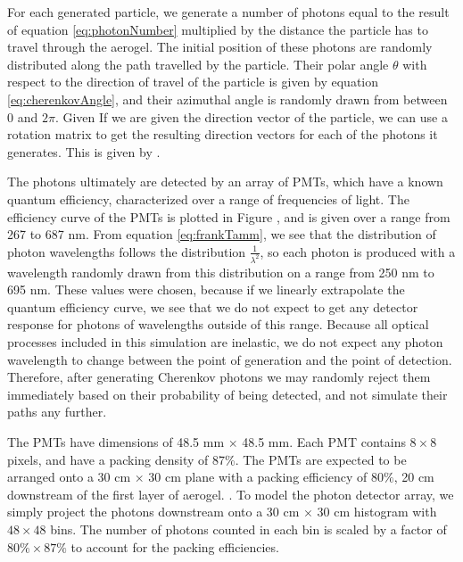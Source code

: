 For each generated particle, we generate a number of photons equal to the result of equation \ref{eq:photonNumber} multiplied by the distance the particle has to travel through the aerogel.
The initial position of these photons are randomly distributed along the path travelled by the particle.
Their polar angle $\theta$ with respect to the direction of travel of the particle is given by equation \ref{eq:cherenkovAngle}, and their azimuthal angle is randomly drawn from between 0 and $2\pi$. Given 
If we are given the direction vector of the particle, we can use a rotation matrix to get the resulting direction vectors for each of the photons it generates.
This is given by .

The photons ultimately are detected by an array of PMTs, which have a known quantum efficiency, characterized over a range of frequencies of light.
The efficiency curve of the PMTs is plotted in  Figure , and is given over a range from 267 to 687 nm.
From equation \ref{eq:frankTamm}, we see that the distribution of photon wavelengths follows the distribution $\frac{1}{\lambda^2}$, so each photon is produced with a wavelength randomly drawn from this distribution on a range from 250 nm to 695 nm.
These values were chosen, because if we linearly extrapolate the quantum efficiency curve, we see that we do not expect to get any detector response for photons of wavelengths outside of this range.
Because all optical processes included in this simulation are inelastic, we do not expect any photon wavelength to change between the point of generation and the point of detection.
Therefore, after generating Cherenkov photons we may randomly reject them immediately based on their probability of being detected, and not simulate their paths any further.

The PMTs have dimensions of 48.5 mm $\times$ 48.5 mm.
Each PMT contains $8 \times 8$ pixels, and have a packing density of 87\%. 
The PMTs are expected to be arranged onto a 30 cm $\times$ 30 cm plane with a packing efficiency of $80\%$, 20 cm downstream of the first layer of aerogel.
.
To model the photon detector array, we simply project the photons downstream onto a 30 cm $\times$ 30 cm histogram with $48 \times 48$ bins.
The number of photons counted in each bin is scaled by a factor of $80\% \times 87\%$ to account for the packing efficiencies.


